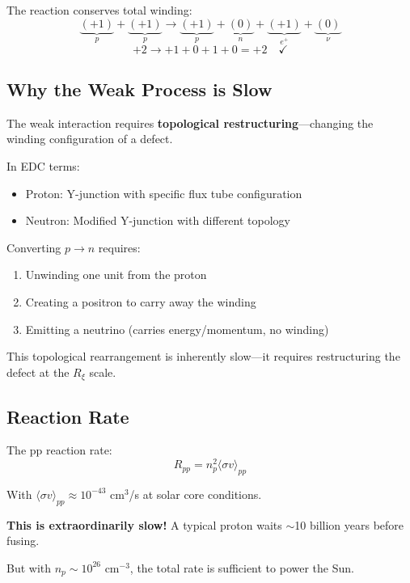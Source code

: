 \documentclass[12pt,a4paper]{article}
\begin{document}
The reaction conserves total winding:
\begin{equation}
\underbrace{(+1)}_{p} + \underbrace{(+1)}_{p} \to \underbrace{(+1)}_{p} + \underbrace{(0)}_{n} + \underbrace{(+1)}_{e^+} + \underbrace{(0)}_{\nu}
\end{equation}
\begin{equation}
+2 \to +1 + 0 + 1 + 0 = +2 \quad \checkmark
\end{equation}

\subsection{Why the Weak Process is Slow}

The weak interaction requires \textbf{topological restructuring}---changing the winding configuration of a defect.

In EDC terms:
\begin{itemize}
    \item Proton: Y-junction with specific flux tube configuration
    \item Neutron: Modified Y-junction with different topology
\end{itemize}

Converting $p \to n$ requires:
\begin{enumerate}
    \item Unwinding one unit from the proton
    \item Creating a positron to carry away the winding
    \item Emitting a neutrino (carries energy/momentum, no winding)
\end{enumerate}

This topological rearrangement is inherently slow---it requires restructuring the defect at the $R_\xi$ scale.

\subsection{Reaction Rate}

The pp reaction rate:
\begin{equation}
R_{pp} = n_p^2 \langle\sigma v\rangle_{pp}
\end{equation}

With $\langle\sigma v\rangle_{pp} \approx 10^{-43}$ cm$^3$/s at solar core conditions.

\begin{insight}
\textbf{This is extraordinarily slow!} A typical proton waits $\sim$10 billion years before fusing.

But with $n_p \sim 10^{26}$ cm$^{-3}$, the total rate is sufficient to power the Sun.
\end{insight}
\end{document}

